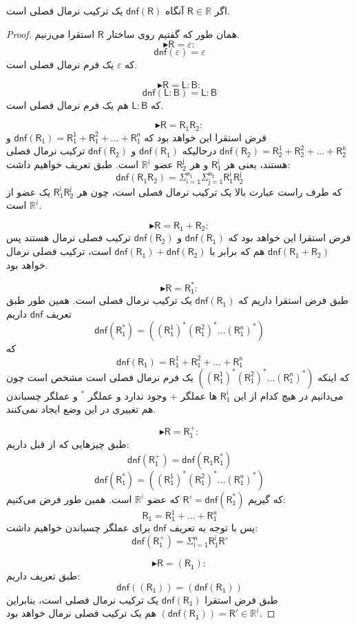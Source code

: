 \begin{thm}
	اگر $\mathsf{R} \in \mathbb{R}$ آنگاه $\mathsf{dnf(R)}$ یک ترکیب نرمال فصلی است.
\end{thm}
\begin{proof}
همان طور که گفتیم روی ساختار $\mathsf{R}$ استقرا می‌زنیم.
$$\blacktriangleright \mathsf{R}=\varepsilon:$$
$$\mathsf{dnf(\varepsilon)}=\varepsilon$$
که $\varepsilon$ یک فرم نرمال فصلی است.


$$\blacktriangleright \mathsf{R=L:B}:$$
$$\mathsf{dnf(\mathsf{L:B})}=\mathsf{L:B}$$
که $\mathsf{L:B}$ هم یک فرم نرمال فصلی است.


$$\blacktriangleright \mathsf{R=R_1R_2}:$$
فرض استقرا این خواهد بود که 
$\mathsf{dnf(R_1)=R_1^1+R_1^2+...+R_1^n}$
و
$\mathsf{dnf(R_2)=R_2^1+R_2^2+...+R_2^n}$
درحالیکه $\mathsf{dnf(R_1)}$ و $\mathsf{dnf(R_2)}$ ترکیب نرمال فصلی هستند، یعنی هر $\mathsf{R_1^i}$ و هر $\mathsf{R_2^j}$ عضو $\mathbb{R^{\nmid}}$ است.
طبق تعریف خواهیم داشت:
$$\mathsf{dnf}(\mathsf{R_1 R_2})=\mathsf{\Sigma_{i=1}^{n_1}\Sigma_{j=1}^{n_2} R_1^i R_2^j}$$
که طرف راست عبارت بالا یک ترکیب نرمال فصلی است، چون هر  
$\mathsf{R_1^i R_2^j}$
یک عضو از $\mathbb{R}^\nmid$ است.

$$\blacktriangleright \mathsf{R=R_1+R_2}:$$
فرض استقرا این خواهد بود که $\mathsf{dnf(R_1)}$ و $\mathsf{dnf(R_2)}$ ترکیب فصلی نرمال هستند پس 
$\mathsf{dnf(R_1+R_2)}$
هم که برابر با
$\mathsf{dnf(R_1)+dnf(R_2)}$
است، ترکیب فصلی نرمال خواهد بود.

$$\blacktriangleright \mathsf{R=R_1^*}:$$
طبق فرض استقرا داریم که $\mathsf{dnf(R_1)}$ یک ترکیب نرمال فصلی است. همین طور طبق تعریف $\mathsf{dnf}$ داریم 
$$\mathsf{dnf(R_1^*)= ((R_1^1)^* (R_1^2)^* ... (R_1^n)^*)}$$
که
$$\mathsf{dnf(R_1)=R_1^1+R_1^2+...+R_1^n}$$
که اینکه $\mathsf{((R_1^1)^* (R_1^2)^* ... (R_1^n)^*)}$ یک فرم نرمال فصلی است مشخص است چون می‌دانیم در هیچ کدام از این $\mathsf{R_1^i}$ ها عملگر $+$ وجود ندارد و عملگر $ ^*$ و عملگر چسباندن هم تغییری در این وضع ایجاد نمی‌کنند.

$$\blacktriangleright \mathsf{R=R_1^+}:$$
طبق چیزهایی که از قبل داریم:
$$\mathsf{dnf(R_1^+)=dnf(R_1 R_1^*)}$$
$$\mathsf{dnf(R_1^*)= ((R_1^1)^* (R_1^2)^* ... (R_1^n)^*)}$$
که گیریم 
$\mathsf{R'=dnf(R_1^*)}$
 که عضو 
 $\mathbb{R^\nmid}$
است. همین طور فرض می‌کنیم:
$$\mathsf{R_1= R_1^1 + ... + R_1^n}$$
پس با توجه به تعریف $\mathsf{dnf}$ برای عملگر چسباندن خواهیم داشت:
$$\mathsf{dnf(R_1^+) = \Sigma_{i=1}^n R_1^i R'}$$

$$\blacktriangleright \mathsf{R=(R_1)}:$$
طبق تعریف داریم:
$$\mathsf{dnf((R_1))=(dnf(R_1))}$$
طبق فرض استقرا 
$\mathsf{dnf(R_1)}$
یک ترکیب نرمال فصلی است، بنابراین 
$\mathsf{(dnf(R_1))=R'} \in \mathbb{R^\nmid}$ 
هم یک ترکیب فصلی نرمال خواهد بود.

\end{proof}

